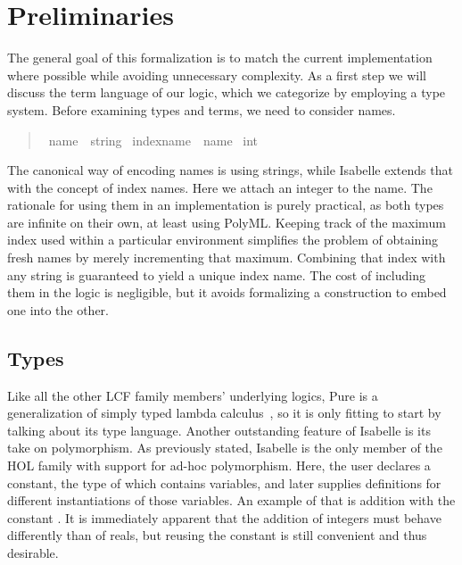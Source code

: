 \chapter{Preliminaries}\label{chapter:preliminaries}

The general goal of this formalization is to match the current implementation where possible while avoiding unnecessary complexity.
As a first step we will discuss the term language of our logic, which we categorize by employing a type system.
Before examining types and terms, we need to consider names.

\begin{quote}
    \begin{isabelle}
        \ name\ {\isacharequal}\ string \isanewline
        \ indexname\ {\isacharequal}\ name {\isasymtimes}\ int
    \end{isabelle}
\end{quote}

The canonical way of encoding names is using strings, while Isabelle extends that with the concept of index names.
Here we attach an integer to the name.
The rationale for using them in an implementation is purely practical, as both types are infinite on their own, at least using PolyML\@.
Keeping track of the maximum index used within a particular environment simplifies the problem of obtaining fresh names by merely incrementing that maximum.
Combining that index with any string is guaranteed to yield a unique index name.
The cost of including them in the logic is negligible, but it avoids formalizing a construction to embed one into the other.

\section{Types}
Like all the other LCF family members' underlying logics, Pure is a generalization of simply typed lambda calculus~\parencite{Church40}, so it is only fitting to start by talking about its type language.
Another outstanding feature of Isabelle is its take on polymorphism.
As previously stated, Isabelle is the only member of the HOL family with support for ad-hoc polymorphism.
Here, the user declares a constant, the type of which contains variables, and later supplies definitions for different instantiations of those variables.
An example of that is addition with the constant .
It is immediately apparent that the addition of integers must behave differently than of reals, but reusing the \isa{(+)} constant is still convenient and thus desirable.

